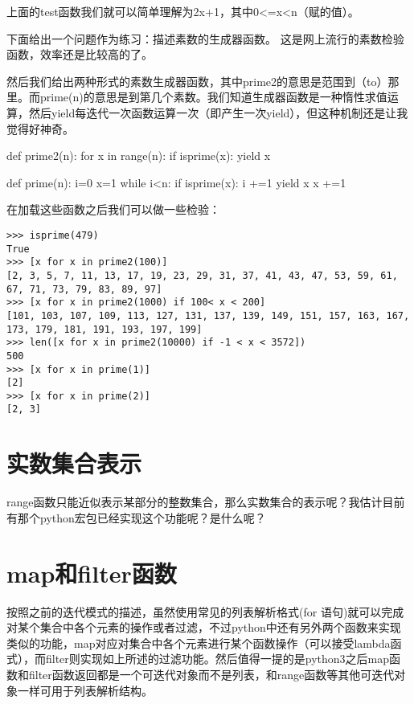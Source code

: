 \documentclass[12pt,oneside]{book}
\begin{document}
\begin{common-format}
上面的test函数我们就可以简单理解为2x+1，其中0<=x<n（赋的值）。

下面给出一个问题作为练习：描述素数的生成器函数。
这是网上流行的素数检验函数，效率还是比较高的了。

然后我们给出两种形式的素数生成器函数，其中prime2的意思是范围到（to）那里。而prime(n)的意思是到第几个素数。我们知道生成器函数是一种惰性求值运算，然后yield每迭代一次函数运算一次（即产生一次yield），但这种机制还是让我觉得好神奇。

\begin{tcbpython}
def prime2(n):
    for x in range(n):
        if isprime(x):
            yield x

def prime(n):
    i=0
    x=1
    while i<n:
        if isprime(x):
            i +=1
            yield x
        x +=1
\end{tcbpython}

在加载这些函数之后我们可以做一些检验：
\begin{Verbatim}
>>> isprime(479)
True
>>> [x for x in prime2(100)]
[2, 3, 5, 7, 11, 13, 17, 19, 23, 29, 31, 37, 41, 43, 47, 53, 59, 61, 67, 71, 73, 79, 83, 89, 97]
>>> [x for x in prime2(1000) if 100< x < 200]
[101, 103, 107, 109, 113, 127, 131, 137, 139, 149, 151, 157, 163, 167, 173, 179, 181, 191, 193, 197, 199]
>>> len([x for x in prime2(10000) if -1 < x < 3572])
500
>>> [x for x in prime(1)]
[2]
>>> [x for x in prime(2)]
[2, 3]
\end{Verbatim}


\section{实数集合表示}
range函数只能近似表示某部分的整数集合，那么实数集合的表示呢？我估计目前有那个python宏包已经实现这个功能呢？是什么呢？

\section{map和filter函数}
按照之前的迭代模式的描述，虽然使用常见的列表解析格式(for 语句)就可以完成对某个集合中各个元素的操作或者过滤，不过python中还有另外两个函数来实现类似的功能，map对应对集合中各个元素进行某个函数操作（可以接受lambda函式），而filter则实现如上所述的过滤功能。然后值得一提的是python3之后map函数和filter函数返回都是一个可迭代对象而不是列表，和range函数等其他可迭代对象一样可用于列表解析结构。


\end{common-format}
\end{document}
